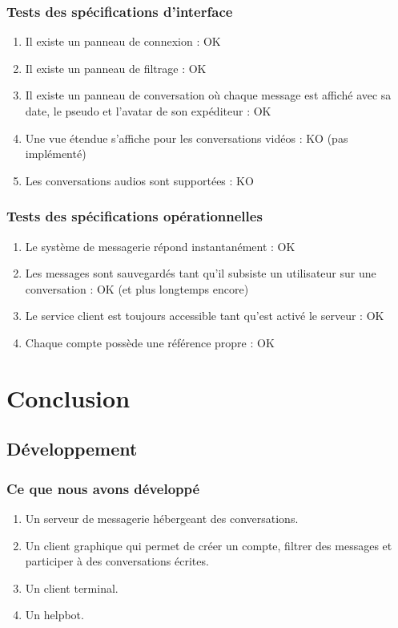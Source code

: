 \documentclass[11pt,dvipsnames,svgnames]{report}
\begin{document}
\subsection{Tests des spécifications d'interface}
\begin{enumerate}
\item Il existe un panneau de connexion : OK
\item Il existe un panneau de filtrage : OK
\item Il existe un panneau de conversation où chaque message est affiché avec sa date, le pseudo et l'avatar de son expéditeur : OK
\item Une vue étendue s'affiche pour les conversations vidéos : KO (pas implémenté)
\item Les conversations audios sont supportées : KO
\end{enumerate}
\subsection{Tests des spécifications opérationnelles}
\begin{enumerate}
\item Le système de messagerie répond instantanément : OK
\item Les messages sont sauvegardés tant qu'il subsiste un utilisateur sur une conversation : OK (et plus longtemps encore)
\item Le service client est toujours accessible tant qu'est activé le serveur : OK
\item Chaque compte possède une référence propre : OK
\end{enumerate}

\chapter{Conclusion}
\section{Développement}
\subsection{Ce que nous avons développé}
\begin{enumerate}
\item Un serveur de messagerie hébergeant des conversations.
\item Un client graphique qui permet de créer un compte, filtrer des messages et participer à des conversations écrites.
\item Un client terminal.
\item Un helpbot.
\end{enumerate}
\end{document}
